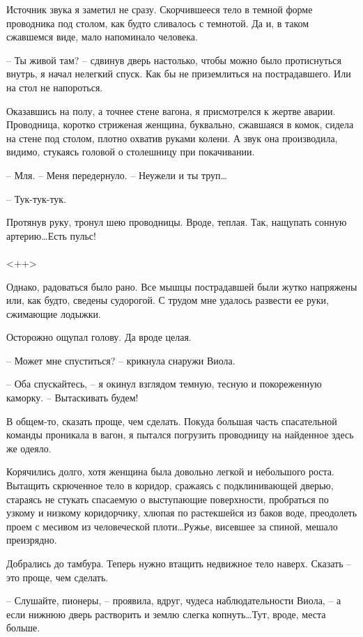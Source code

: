 \documentclass[a4paper]{book}
\begin{document}
Источник звука я заметил не сразу. Скорчившееся  тело в темной форме проводника под столом, как будто сливалось с темнотой. Да и, в таком сжавшемся виде, мало напоминало человека. 

-- Ты живой там? -- сдвинув дверь настолько, чтобы можно было протиснуться внутрь, я начал нелегкий спуск. Как бы не приземлиться на пострадавшего. Или на стол не напороться.

Оказавшись на полу, а точнее стене вагона, я присмотрелся к жертве аварии. Проводница, коротко стриженая женщина, буквально, сжавшаяся в комок, сидела на стене под столом, плотно охватив руками колени. А звук она производила, видимо, стукаясь головой о столешницу при покачивании.

-- Мля. -- Меня передернуло. -- Неужели и ты труп\ldots

-- Тук-тук-тук.

Протянув руку, тронул шею проводницы. Вроде, теплая. Так, нащупать сонную артерию\ldots Есть пульс!

\paragraph{}<++>

Однако, радоваться было рано. Все мышцы пострадавшей были жутко напряжены или, как будто, сведены судорогой. С трудом мне удалось развести ее руки, сжимающие лодыжки. 

Осторожно ощупал голову. Да вроде целая. 

-- Может мне спуститься? -- крикнула снаружи Виола.

-- Оба спускайтесь, -- я окинул взглядом темную, тесную и покореженную каморку. -- Вытаскивать будем! 

В общем-то, сказать проще, чем сделать. Покуда большая часть спасательной команды проникала в вагон, я пытался погрузить проводницу на найденное здесь же одеяло. 

Корячились долго, хотя женщина была довольно легкой и небольшого роста. Вытащить скрюченное тело в коридор, сражаясь с подклинивающей дверью, стараясь не стукать спасаемую о выступающие поверхности, пробраться по узкому и низкому коридорчику, хлюпая по растекшейся из баков воде, преодолеть проем с месивом из человеческой плоти\ldots Ружье, висевшее за спиной, мешало преизрядно. 

Добрались до тамбура. Теперь нужно втащить недвижное тело наверх. Сказать -- это проще, чем сделать. 

-- Слушайте, пионеры, -- проявила, вдруг, чудеса наблюдательности Виола, -- а если нижнюю дверь растворить и землю слегка копнуть\ldots Тут, вроде, места больше.
\end{document}
